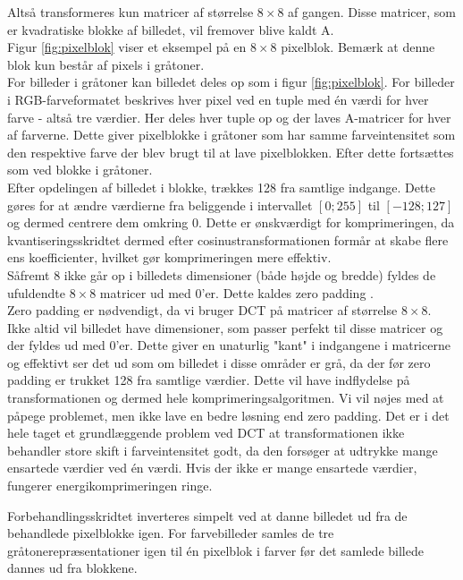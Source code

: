Altså transformeres kun matricer af størrelse $8\times8$ af gangen. Disse matricer, som er kvadratiske blokke af billedet, vil fremover blive kaldt A.\\
Figur \vref{fig:pixelblok} viser et eksempel på en $8\times8$ pixelblok. Bemærk at denne blok kun består af pixels i gråtoner.\\
For billeder i gråtoner kan billedet deles op som i figur \vref{fig:pixelblok}. For billeder i RGB-farveformatet beskrives hver pixel ved en tuple med én værdi for hver farve - altså tre værdier. Her deles hver tuple op og der laves A-matricer for hver af farverne. Dette giver pixelblokke i gråtoner som har samme farveintensitet som den respektive farve der blev brugt til at lave pixelblokken. Efter dette fortsættes som ved blokke i gråtoner.\\
Efter opdelingen af billedet i blokke, trækkes 128 fra samtlige indgange. Dette gøres for at ændre værdierne fra beliggende i intervallet $[0;255]$ til $[-128;127]$ og dermed centrere dem omkring 0. Dette er ønskværdigt for komprimeringen, da kvantiseringsskridtet dermed efter cosinustransformationen formår at skabe flere ens koefficienter, hvilket gør komprimeringen mere effektiv.\\
Såfremt 8 ikke går op i billedets dimensioner (både højde og bredde) fyldes de ufuldendte $8\times8$ matricer ud med 0'er. Dette kaldes zero padding \citep{zero_padding}.\\
Zero padding er nødvendigt, da vi bruger DCT på matricer af størrelse $8\times8$. Ikke altid vil billedet have dimensioner, som passer perfekt til disse matricer og der fyldes ud med 0'er. Dette giver en unaturlig "kant" i indgangene i matricerne og effektivt ser det ud som om billedet i disse områder er grå, da der før zero padding er trukket 128 fra samtlige værdier. Dette vil have indflydelse på transformationen og dermed hele komprimeringsalgoritmen. Vi vil nøjes med at påpege problemet, men ikke lave en bedre løsning end zero padding. Det er i det hele taget et grundlæggende problem ved DCT at transformationen ikke behandler store skift i farveintensitet godt, da den forsøger at udtrykke mange ensartede værdier ved én værdi. Hvis der ikke er mange ensartede værdier, fungerer energikomprimeringen ringe.

Forbehandlingsskridtet inverteres simpelt ved at danne billedet ud fra de behandlede pixelblokke igen. For farvebilleder samles de tre gråtonerepræsentationer igen til én pixelblok i farver før det samlede billede dannes ud fra blokkene.

